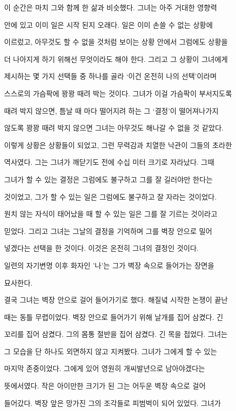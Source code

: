 이 순간은 마치 그와 함께 한 삶과 비슷했다. 그녀는 아주 거대한 영향력

안에 있고 이미 일은 시작 된지 오래다. 일은 이미 손쓸 수 없는 상황에

이르렀고, 아무것도 할 수 없을 것처럼 보이는 상황 안에서 그럼에도 상황을

더 나아지게 하기 위해선 무엇이라도 해야 한다. 그리고 그 상황이 그녀에게

제시하는 몇 가지 선택들 중 하나를 골라 `이건 온전히 나의 선택'이라며

스스로의 가슴팍에 꽝꽝 때려 박는 것이다. 그녀가 이걸 가슴팍이 부서지도록

때려 박지 않으면, 틈날 때 마다 떨어지려 하는 그 `결정'이 떨어져나가지

않도록 꽝꽝 때려 박지 않으면 그녀는 아무것도 해나갈 수 없을 것 같았다.

이렇게 상황은 상황들이 되었고, 그런 무력감과 치열한 낙관이 그들의 초라한

역사였다. 그는 그녀가 깨닫기도 전에 수십 미터 크기로 자라났다. 그때

그녀가 할 수 있는 결정은 그럼에도 불구하고 그를 잘 길러야만 한다는

것이었고, 그가 할 수 있는 일은 그럼에도 불구하고 잘 자라는 것이었다.

원치 않는 자식이 태어났을 때 할 수 있는 일은 그를 잘 기르는 것이라고

믿었다. 그리고 그녀는 그날의 결정을 기억하며 그를 벽장 안으로 밀어

넣겠다는 선택을 한 것이다. 이것은 온전히 그녀의 결정인 것이다.



일련의 자기변명 이후 화자인 '나'는 그가 벽장 속으로 들어가는 장면을

묘사한다.



결국 그녀는 벽장 안으로 걸어 들어가기로 했다. 해질녘 시작한 논쟁이 끝난

때는 동틀 무렵이었다. 벽장 안으로 들어가기 위해 날개를 집어 삼켰다. 긴

꼬리를 집어 삼켰다. 그의 몸통 절반을 집어 삼켰다. 긴 목을 접었다. 그녀는

그 모습을 단 하나도 외면하지 않고 지켜봤다. 그녀가 그에게 할 수 있는

마지막 존중이었다. 그에게 있어 영원히 개씨발년으로 남아야겠다는

뜻에서였다. 작은 아이만한 크기가 된 그는 어두운 벽장 속으로 걸어

들어갔다. 벽장 앞은 망가진 그의 조각들로 피범벅이 되어 있었다. 그녀가

